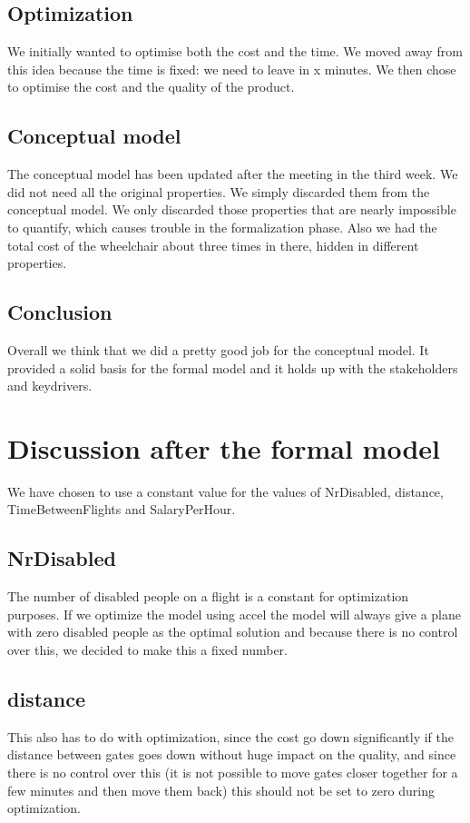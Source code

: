 \documentclass[a4paper, 11pt, notitlepage]{report}
\begin{document}
	\section{Optimization} We initially wanted to optimise both the cost and the time. We moved away from this idea because the time is fixed: we need to leave in x minutes. We then chose to optimise the cost and the quality of the product.
	
	\section{Conceptual model} The conceptual model has been updated after the meeting in the third week. We did not need all the original properties. We simply discarded them from the conceptual model. We only discarded those properties that are nearly impossible to quantify, which causes trouble in the formalization phase. Also we had the total cost of the wheelchair about three times in there, hidden in different properties.
	
	\section{Conclusion} Overall we think that we did a pretty good job for the conceptual model. It provided a solid basis for the formal model and it holds up with the stakeholders and keydrivers.


\chapter{Discussion after the formal model}
We have chosen to use a constant value for the values of NrDisabled, distance, TimeBetweenFlights and SalaryPerHour.\\
	
	\section{NrDisabled}
The number of disabled people on a flight is a constant for optimization purposes. If we optimize the model using accel the  model will always give a plane with zero disabled people as the optimal solution and because there is no control over this, we decided to make this a fixed number.
	
	\section{distance}
This also has to do with optimization, since the cost go down significantly if the distance between gates goes down without huge impact on the quality, and since there is no control over this (it is not possible to move gates closer together for a few minutes and then move them back) this should not be set to zero during optimization.
	
\end{document}
